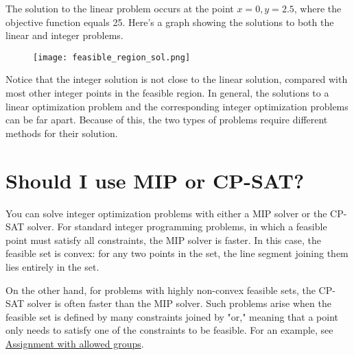\documentclass[a4paper,12pt,notitlepage,twoside,openright]{article}
\begin{document}
The solution to the linear problem occurs at the point \(x = 0,  y = 2.5\), where the objective function equals 25. Here's a graph showing the solutions to both the linear and integer problems.

\begin{figure}[H]
\centering
\texttt{[image: feasible\_region\_sol.png]}
\end{figure}

Notice that the integer solution is not close to the linear solution, compared with most other integer points in the feasible region. In general, the solutions to a linear optimization problem and the corresponding integer optimization problems can be far apart. Because of this, the two types of problems require different methods for their solution.

\section{Should I use MIP or CP-SAT?}

You can solve integer optimization problems with either a MIP solver or the CP-SAT solver. For standard integer programming problems, in which a feasible point must satisfy all constraints, the MIP solver is faster. In this case, the feasible set is convex: for any two points in the set, the line segment joining them lies entirely in the set.

On the other hand, for problems with highly non-convex feasible sets, the CP-SAT solver is often faster than the MIP solver. Such problems arise when the feasible set is defined by many constraints joined by "or," meaning that a point only needs to satisfy one of the constraints to be feasible. For an example, see \href{https://developers.google.com/optimization/assignment/assignment_groups}{Assignment with allowed groups}.
\end{document}
